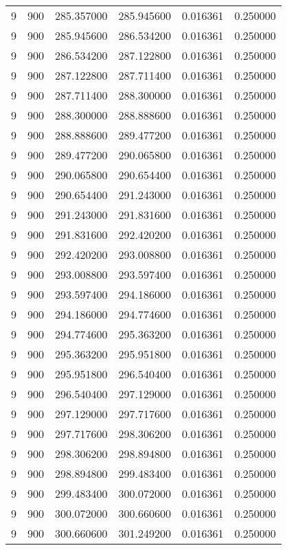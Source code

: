 \begin{longtable}{rrrrrr}
9 & 900 & 285.357000 & 285.945600 & 0.016361 & 0.250000 \\
9 & 900 & 285.945600 & 286.534200 & 0.016361 & 0.250000 \\
9 & 900 & 286.534200 & 287.122800 & 0.016361 & 0.250000 \\
9 & 900 & 287.122800 & 287.711400 & 0.016361 & 0.250000 \\
9 & 900 & 287.711400 & 288.300000 & 0.016361 & 0.250000 \\
9 & 900 & 288.300000 & 288.888600 & 0.016361 & 0.250000 \\
9 & 900 & 288.888600 & 289.477200 & 0.016361 & 0.250000 \\
9 & 900 & 289.477200 & 290.065800 & 0.016361 & 0.250000 \\
9 & 900 & 290.065800 & 290.654400 & 0.016361 & 0.250000 \\
9 & 900 & 290.654400 & 291.243000 & 0.016361 & 0.250000 \\
9 & 900 & 291.243000 & 291.831600 & 0.016361 & 0.250000 \\
9 & 900 & 291.831600 & 292.420200 & 0.016361 & 0.250000 \\
9 & 900 & 292.420200 & 293.008800 & 0.016361 & 0.250000 \\
9 & 900 & 293.008800 & 293.597400 & 0.016361 & 0.250000 \\
9 & 900 & 293.597400 & 294.186000 & 0.016361 & 0.250000 \\
9 & 900 & 294.186000 & 294.774600 & 0.016361 & 0.250000 \\
9 & 900 & 294.774600 & 295.363200 & 0.016361 & 0.250000 \\
9 & 900 & 295.363200 & 295.951800 & 0.016361 & 0.250000 \\
9 & 900 & 295.951800 & 296.540400 & 0.016361 & 0.250000 \\
9 & 900 & 296.540400 & 297.129000 & 0.016361 & 0.250000 \\
9 & 900 & 297.129000 & 297.717600 & 0.016361 & 0.250000 \\
9 & 900 & 297.717600 & 298.306200 & 0.016361 & 0.250000 \\
9 & 900 & 298.306200 & 298.894800 & 0.016361 & 0.250000 \\
9 & 900 & 298.894800 & 299.483400 & 0.016361 & 0.250000 \\
9 & 900 & 299.483400 & 300.072000 & 0.016361 & 0.250000 \\
9 & 900 & 300.072000 & 300.660600 & 0.016361 & 0.250000 \\
9 & 900 & 300.660600 & 301.249200 & 0.016361 & 0.250000 \\

\end{longtable}

